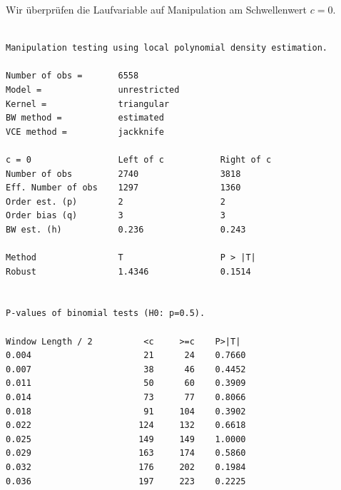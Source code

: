 \documentclass[
  a4paper,
  DIV=11,
  oneside]{scrreprt}
\newenvironment{Shaded}{\begin{snugshade}}{\end{snugshade}}
\newcommand{\AttributeTok}[1]{\textcolor[rgb]{0.40,0.45,0.13}{#1}}
\newcommand{\CommentTok}[1]{\textcolor[rgb]{0.37,0.37,0.37}{#1}}
\newcommand{\FunctionTok}[1]{\textcolor[rgb]{0.28,0.35,0.67}{#1}}
\newcommand{\NormalTok}[1]{\textcolor[rgb]{0.00,0.23,0.31}{#1}}
\newcommand{\OtherTok}[1]{\textcolor[rgb]{0.00,0.23,0.31}{#1}}
\newcommand{\SpecialCharTok}[1]{\textcolor[rgb]{0.37,0.37,0.37}{#1}}
\newcommand{\StringTok}[1]{\textcolor[rgb]{0.13,0.47,0.30}{#1}}
\begin{document}
Wir überprüfen die Laufvariable auf Manipulation am Schwellenwert
\(c=0\).

\begin{Shaded}
\end{Shaded}

\begin{verbatim}

Manipulation testing using local polynomial density estimation.

Number of obs =       6558
Model =               unrestricted
Kernel =              triangular
BW method =           estimated
VCE method =          jackknife

c = 0                 Left of c           Right of c          
Number of obs         2740                3818                
Eff. Number of obs    1297                1360                
Order est. (p)        2                   2                   
Order bias (q)        3                   3                   
BW est. (h)           0.236               0.243               

Method                T                   P > |T|             
Robust                1.4346              0.1514              


P-values of binomial tests (H0: p=0.5).

Window Length / 2          <c     >=c    P>|T|
0.004                      21      24    0.7660
0.007                      38      46    0.4452
0.011                      50      60    0.3909
0.014                      73      77    0.8066
0.018                      91     104    0.3902
0.022                     124     132    0.6618
0.025                     149     149    1.0000
0.029                     163     174    0.5860
0.032                     176     202    0.1984
0.036                     197     223    0.2225
\end{verbatim}

\begin{Shaded}
\end{Shaded}
\end{document}
